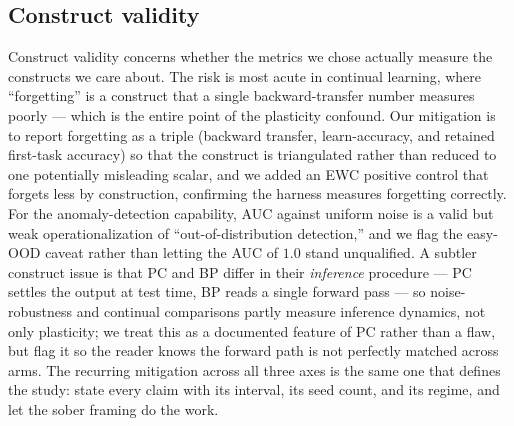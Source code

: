 \subsection{Construct validity}

Construct validity concerns whether the metrics we chose actually measure the constructs we care
about. The risk is most acute in continual learning, where ``forgetting'' is a construct that a
single backward-transfer number measures poorly --- which is the entire point of the plasticity
confound. Our mitigation is to report forgetting as a triple (backward transfer, learn-accuracy, and
retained first-task accuracy) so that the construct is triangulated rather than reduced to one
potentially misleading scalar, and we added an EWC positive control that forgets less by
construction, confirming the harness measures forgetting correctly. For the anomaly-detection
capability, AUC against uniform noise is a valid but weak operationalization of ``out-of-distribution
detection,'' and we flag the easy-OOD caveat rather than letting the AUC of $1.0$ stand unqualified.
A subtler construct issue is that PC and BP differ in their \emph{inference} procedure --- PC settles
the output at test time, BP reads a single forward pass --- so noise-robustness and continual
comparisons partly measure inference dynamics, not only plasticity; we treat this as a documented
feature of PC rather than a flaw, but flag it so the reader knows the forward path is not perfectly
matched across arms. The recurring mitigation across all three axes is the same one that defines the
study: state every claim with its interval, its seed count, and its regime, and let the sober framing
do the work.
